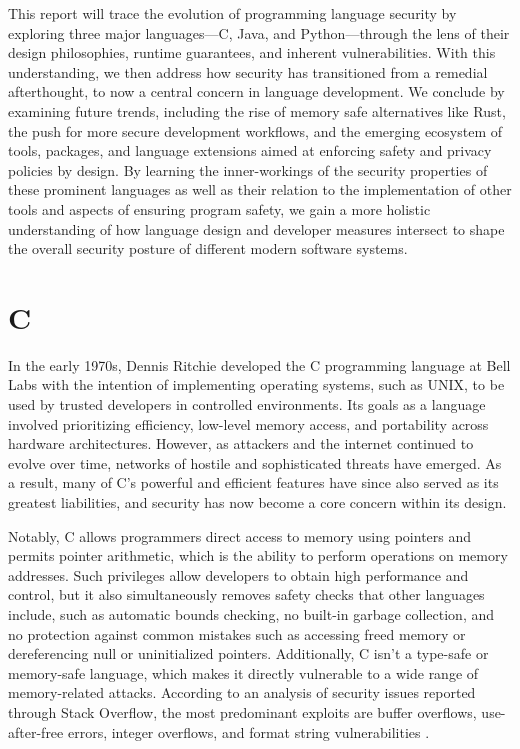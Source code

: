 \documentclass[conference]{IEEEtran}
\begin{document}
This report will trace the evolution of programming language security by exploring three major languages—C, Java, and Python—through the lens of their design philosophies, runtime guarantees, and inherent vulnerabilities. With this understanding, we then address how security has transitioned from a remedial afterthought, to now a central concern in language development. We conclude by examining future trends, including the rise of memory safe alternatives like Rust, the push for more secure development workflows, and the emerging ecosystem of tools, packages, and language extensions aimed at enforcing safety and privacy policies by design. By learning the inner-workings of the security properties of these prominent languages as well as their relation to the implementation of other tools and aspects of ensuring program safety, we gain a more holistic understanding of how language design and developer measures intersect to shape the overall security posture of different modern software systems.


\section{C} 

In the early 1970s, Dennis Ritchie developed the C programming language at Bell Labs with the intention of implementing operating systems, such as UNIX, to be used by trusted developers in controlled environments. Its goals as a language involved prioritizing efficiency, low-level memory access, and portability across hardware architectures. However, as attackers and the internet continued to evolve over time, networks of hostile and sophisticated threats have emerged. As a result, many of C's powerful and efficient features have since also served as its greatest liabilities, and security has now become a core concern within its design.

Notably, C allows programmers direct access to memory using pointers and permits pointer arithmetic, which is the ability to perform operations on memory addresses. Such privileges allow developers to obtain high performance and control, but it also simultaneously removes safety checks that other languages include, such as automatic bounds checking, no built-in garbage collection, and no protection against common mistakes such as accessing freed memory or dereferencing null or uninitialized pointers. Additionally, C isn't a type-safe or memory-safe language, which makes it directly vulnerable to a wide range of memory-related attacks. According to an analysis of security issues reported through Stack Overflow, the most predominant exploits are buffer overflows, use-after-free errors, integer overflows, and format string vulnerabilities \cite{Croft2021}.
\end{document}
